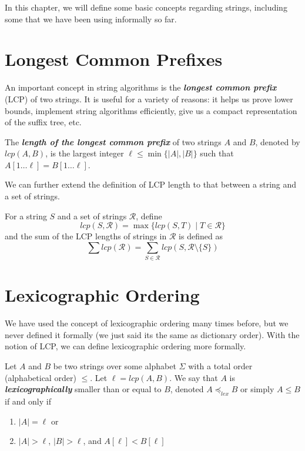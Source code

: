 In this chapter, we will define some basic concepts regarding strings, including some that we have been using informally so far.

\section{Longest Common Prefixes}

An important concept in string algorithms is the \textit{\textbf{longest common prefix}} (LCP) of two strings. It is useful for a variety of reasons: it helps us prove lower bounds, implement string algorithms efficiently, give us a compact representation of the suffix tree, etc.

\begin{definition}
    The \textit{\textbf{length of the longest common prefix}} of two strings $A$ and $B$, denoted by $\mathit{lcp}(A,B)$, is the largest integer $\ell \leq \min \{|A|,|B|\}$ such that $A[1\ldots \ell] = B[1 \ldots \ell]$. 
\end{definition}

We can further extend the definition of LCP length to that between a string and a set of strings.

\begin{definition}
    For a string $S$ and a set of strings $\mathcal{R}$, define
    $$
    \mathit{lcp}(S,\mathcal{R}) = \max\{ \mathit{lcp}(S,T) \mid T \in \mathcal{R} \}
    $$
    and the sum of the LCP lengths of strings in $\mathcal{R}$ is defined as
    $$
    \sum \mathit{lcp}(\mathcal{R}) = \sum_{S \in \mathcal{R}} \mathit{lcp}(S,\mathcal{R} \setminus \{S\})
    $$
\end{definition}

\section{Lexicographic Ordering}

We have used the concept of lexicographic ordering many times before, but we never defined it formally (we just said its the same as dictionary order). With the notion of LCP, we can define lexicographic ordering more formally.

\begin{definition}
    Let $A$ and $B$ be two strings over some alphabet $\Sigma$ with a total order (alphabetical order) $\leq$. Let $\ell = \mathit{lcp}(A,B)$. We say that $A$ is \textit{\textbf{lexicographically}} smaller than or equal to $B$, denoted $A \preceq_{lex} B$ or simply $A \leq B$ if and only if
    \begin{enumerate}
        \item $|A| = \ell$ or
        \item $|A| > \ell$, $|B| > \ell$, and $A[\ell] < B[\ell]$
    \end{enumerate}
\end{definition}

